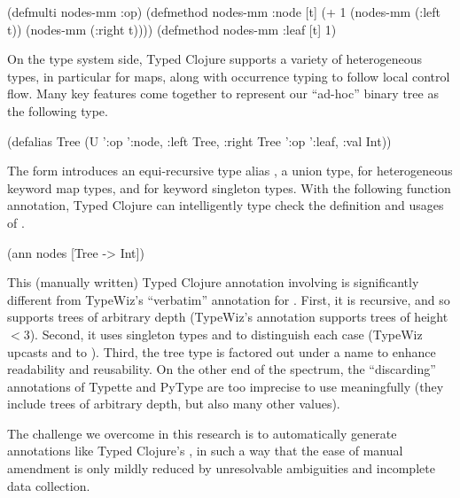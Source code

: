 \begin{cljlisting}
(defmulti nodes-mm :op)
(defmethod nodes-mm :node [t] (+ 1 (nodes-mm (:left t)) (nodes-mm (:right t))))
(defmethod nodes-mm :leaf [t] 1)
\end{cljlisting}

On the type system side, Typed Clojure supports a variety of heterogeneous types,
in particular for maps, along with occurrence typing \cite{TF10} to follow local control flow.
Many key features come together to represent our ``ad-hoc'' binary tree as the following type.

\begin{cljlisting}
(defalias Tree
  (U '{:op ':node, :left Tree, :right Tree}
     '{:op ':leaf, :val Int}))
\end{cljlisting}

The  form introduces an equi-recursive type alias ,
 a union type,  for heterogeneous keyword map types,
and  for keyword singleton types.
With the following function annotation, Typed Clojure can intelligently type check
the definition and usages of .

\begin{cljlisting}
(ann nodes [Tree -> Int])
\end{cljlisting}

This (manually written) Typed Clojure annotation involving 
is significantly different from TypeWiz's ``verbatim'' annotation for .
First, it is recursive, and so supports trees of arbitrary depth (TypeWiz's annotation
supports trees of height $<3$).
Second, it uses singleton types  and  to distinguish each case
(TypeWiz upcasts  and  to ).
Third, the tree type is factored out under a name to enhance readability and reusability.
On the other end of the spectrum, the ``discarding'' annotations of Typette and PyType
are too imprecise to use meaningfully (they include trees of arbitrary depth, but
also many other values).

The challenge we overcome in this research is to automatically generate
annotations like Typed Clojure's , in such a way that the ease of manual amendment is
only mildly reduced by unresolvable ambiguities and incomplete data collection.

